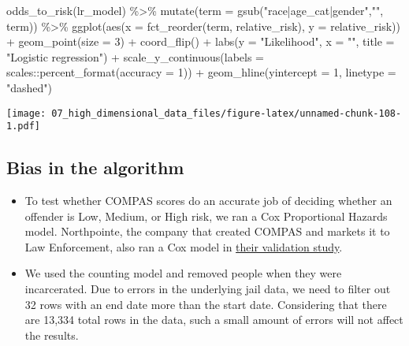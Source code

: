 \documentclass[
]{book}
\newenvironment{Shaded}{\begin{snugshade}}{\end{snugshade}}
\newcommand{\AttributeTok}[1]{\textcolor[rgb]{0.77,0.63,0.00}{#1}}
\newcommand{\DecValTok}[1]{\textcolor[rgb]{0.00,0.00,0.81}{#1}}
\newcommand{\FunctionTok}[1]{\textcolor[rgb]{0.00,0.00,0.00}{#1}}
\newcommand{\NormalTok}[1]{#1}
\newcommand{\SpecialCharTok}[1]{\textcolor[rgb]{0.00,0.00,0.00}{#1}}
\newcommand{\StringTok}[1]{\textcolor[rgb]{0.31,0.60,0.02}{#1}}
\begin{document}
\begin{Shaded}
\begin{Highlighting}[]
\FunctionTok{odds\_to\_risk}\NormalTok{(lr\_model) }\SpecialCharTok{\%\textgreater{}\%}
    \FunctionTok{mutate}\NormalTok{(}\AttributeTok{term =} \FunctionTok{gsub}\NormalTok{(}\StringTok{"race|age\_cat|gender"}\NormalTok{,}\StringTok{""}\NormalTok{, term)) }\SpecialCharTok{\%\textgreater{}\%} 
    \FunctionTok{ggplot}\NormalTok{(}\FunctionTok{aes}\NormalTok{(}\AttributeTok{x =} \FunctionTok{fct\_reorder}\NormalTok{(term, relative\_risk), }\AttributeTok{y =}\NormalTok{ relative\_risk)) }\SpecialCharTok{+}
        \FunctionTok{geom\_point}\NormalTok{(}\AttributeTok{size =} \DecValTok{3}\NormalTok{) }\SpecialCharTok{+}
        \FunctionTok{coord\_flip}\NormalTok{() }\SpecialCharTok{+}
        \FunctionTok{labs}\NormalTok{(}\AttributeTok{y =} \StringTok{"Likelihood"}\NormalTok{, }\AttributeTok{x =} \StringTok{""}\NormalTok{,}
             \AttributeTok{title =} \StringTok{"Logistic regression"}\NormalTok{) }\SpecialCharTok{+}
        \FunctionTok{scale\_y\_continuous}\NormalTok{(}\AttributeTok{labels =}\NormalTok{ scales}\SpecialCharTok{::}\FunctionTok{percent\_format}\NormalTok{(}\AttributeTok{accuracy =} \DecValTok{1}\NormalTok{)) }\SpecialCharTok{+}
        \FunctionTok{geom\_hline}\NormalTok{(}\AttributeTok{yintercept =} \DecValTok{1}\NormalTok{, }\AttributeTok{linetype =} \StringTok{"dashed"}\NormalTok{)}
\end{Highlighting}
\end{Shaded}

\texttt{[image: 07\_high\_dimensional\_data\_files/figure-latex/unnamed-chunk-108-1.pdf]}

\hypertarget{bias-in-the-algorithm}{%
\subsection{Bias in the algorithm}\label{bias-in-the-algorithm}}

\begin{itemize}
\item
  To test whether COMPAS scores do an accurate job of deciding whether an offender is Low, Medium, or High risk, we ran a Cox Proportional Hazards model. Northpointe, the company that created COMPAS and markets it to Law Enforcement, also ran a Cox model in \href{https://journals.sagepub.com/doi/abs/10.1177/0093854808326545}{their validation study}.
\item
  We used the counting model and removed people when they were incarcerated. Due to errors in the underlying jail data, we need to filter out 32 rows with an end date more than the start date. Considering that there are 13,334 total rows in the data, such a small amount of errors will not affect the results.
\end{itemize}
\end{document}
